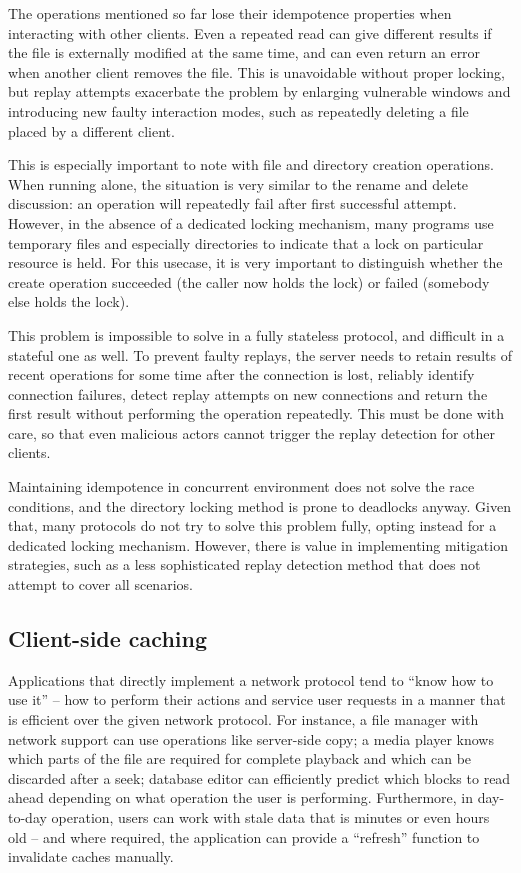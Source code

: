 The operations mentioned so far lose their idempotence properties when interacting with other clients. Even
a repeated read can give different results if the file is externally modified at the same time, and can even
return an error when another client removes the file. This is unavoidable without proper locking, but replay
attempts exacerbate the problem by enlarging vulnerable windows and introducing new faulty interaction modes,
such as repeatedly deleting a file placed by a different client.

This is especially important to note with file and directory creation operations. When running alone, the
situation is very similar to the rename and delete discussion: an operation will repeatedly fail after first
successful attempt. However, in the absence of a dedicated locking mechanism, many programs use temporary
files and especially directories to indicate that a lock on particular resource is held.  For this usecase, it
is very important to distinguish whether the create operation succeeded (the caller now holds the lock) or
failed (somebody else holds the lock).

This problem is impossible to solve in a fully stateless protocol, and difficult in a stateful one as well. To
prevent faulty replays, the server needs to retain results of recent operations for some time after the
connection is lost, reliably identify connection failures, detect replay attempts on new connections and
return the first result without performing the operation repeatedly. This must be done with care, so that even
malicious actors cannot trigger the replay detection for other clients.

Maintaining idempotence in concurrent environment does not solve the race conditions, and the directory
locking method is prone to deadlocks anyway. Given that, many protocols do not try to solve this problem
fully, opting instead for a dedicated locking mechanism. However, there is value in implementing mitigation
strategies, such as a less sophisticated replay detection method that does not attempt to cover all scenarios.


\subsection{Client-side caching}

Applications that directly implement a network protocol tend to ``know how to use it'' -- how to perform their
actions and service user requests in a manner that is efficient over the given network protocol. For instance,
a file manager with network support can use operations like server-side copy; a media player knows which parts
of the file are required for complete playback and which can be discarded after a seek; database editor can
efficiently predict which blocks to read ahead depending on what operation the user is performing.
Furthermore, in day-to-day operation, users can work with stale data that is minutes or even hours old -- and
where required, the application can provide a ``refresh'' function to invalidate caches manually.

